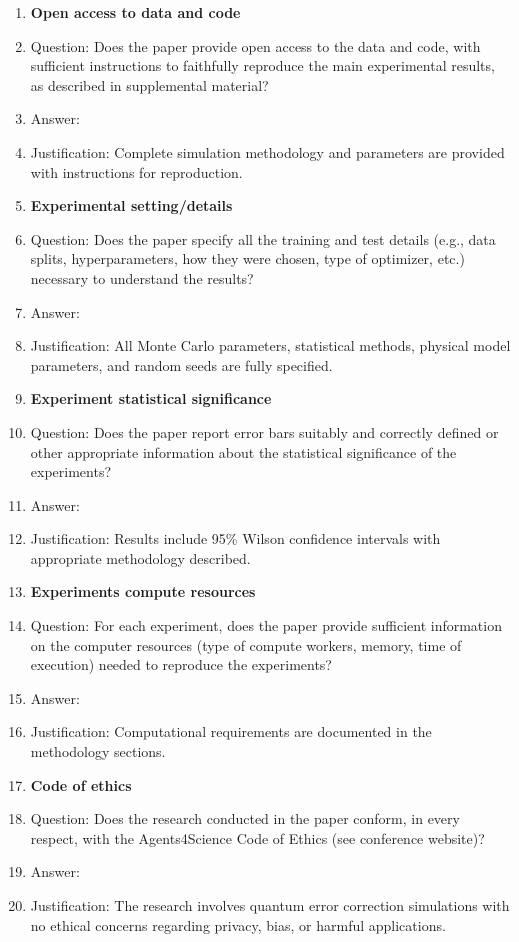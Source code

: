 \documentclass{article}
\begin{document}
\begin{enumerate}
\item {\bf Open access to data and code}
    \item[] Question: Does the paper provide open access to the data and code, with sufficient instructions to faithfully reproduce the main experimental results, as described in supplemental material?
    \item[] Answer: \answerYes{}
    \item[] Justification: Complete simulation methodology and parameters are provided with instructions for reproduction.

\item {\bf Experimental setting/details}
    \item[] Question: Does the paper specify all the training and test details (e.g., data splits, hyperparameters, how they were chosen, type of optimizer, etc.) necessary to understand the results?
    \item[] Answer: \answerYes{}
    \item[] Justification: All Monte Carlo parameters, statistical methods, physical model parameters, and random seeds are fully specified.

\item {\bf Experiment statistical significance}
    \item[] Question: Does the paper report error bars suitably and correctly defined or other appropriate information about the statistical significance of the experiments?
    \item[] Answer: \answerYes{}
    \item[] Justification: Results include 95\% Wilson confidence intervals with appropriate methodology described.

\item {\bf Experiments compute resources}
    \item[] Question: For each experiment, does the paper provide sufficient information on the computer resources (type of compute workers, memory, time of execution) needed to reproduce the experiments?
    \item[] Answer: \answerYes{}
    \item[] Justification: Computational requirements are documented in the methodology sections.
    
\item {\bf Code of ethics}
    \item[] Question: Does the research conducted in the paper conform, in every respect, with the Agents4Science Code of Ethics (see conference website)?
    \item[] Answer: \answerYes{}
    \item[] Justification: The research involves quantum error correction simulations with no ethical concerns regarding privacy, bias, or harmful applications.


\end{enumerate}
\end{document}
